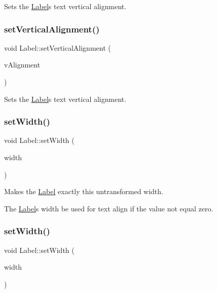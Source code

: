 Sets the \hyperlink{classLabel}{Label}\textquotesingle{}s text vertical alignment. \mbox{\label{classLabel_a97b358d0917e0a70b16146ec3a105d42}} 
\subsubsection{\texorpdfstring{set\+Vertical\+Alignment()}{setVerticalAlignment()}\hspace{0.1cm}{\footnotesize\ttfamily [2/2]}}
{\footnotesize\ttfamily void Label\+::set\+Vertical\+Alignment (\begin{DoxyParamCaption}\item[{Text\+V\+Alignment}]{v\+Alignment }\end{DoxyParamCaption})\hspace{0.3cm}{\ttfamily [inline]}}

Sets the \hyperlink{classLabel}{Label}\textquotesingle{}s text vertical alignment. \mbox{\label{classLabel_a4f92bf5284beb87cf0315284a9a1c04d}} 
\subsubsection{\texorpdfstring{set\+Width()}{setWidth()}\hspace{0.1cm}{\footnotesize\ttfamily [1/2]}}
{\footnotesize\ttfamily void Label\+::set\+Width (\begin{DoxyParamCaption}\item[{float}]{width }\end{DoxyParamCaption})\hspace{0.3cm}{\ttfamily [inline]}}

Makes the \hyperlink{classLabel}{Label} exactly this untransformed width.

The \hyperlink{classLabel}{Label}\textquotesingle{}s width be used for text align if the value not equal zero. \mbox{\label{classLabel_a4f92bf5284beb87cf0315284a9a1c04d}} 
\subsubsection{\texorpdfstring{set\+Width()}{setWidth()}\hspace{0.1cm}{\footnotesize\ttfamily [2/2]}}
{\footnotesize\ttfamily void Label\+::set\+Width (\begin{DoxyParamCaption}\item[{float}]{width }\end{DoxyParamCaption})\hspace{0.3cm}{\ttfamily [inline]}}

